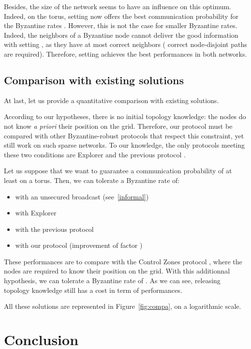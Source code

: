 \documentclass[a4paper,11pt]{article}
\begin{document}
Besides, the size of the network seems to have an influence on this optimum. Indeed, on the  torus, setting  now offers the best communication probability for the Byzantine rates .
However, this is not the case for smaller Byzantine rates. Indeed, the neighbors of a Byzantine node cannot deliver the good information with setting , as they have at most  correct neighbors ( correct node-disjoint paths are required). Therefore, setting  achieves the best performances in both networks.

\subsection{Comparison with existing solutions}

At last, let us provide a quantitative comparison with existing solutions. 

According to our hypotheses, there is no initial topology knowledge:
the nodes do not know \emph{a priori} their position on the grid. Therefore, our protocol must be compared with other Byzantine-robust protocols that respect this constraint, yet still work on such sparse networks.
To our knowledge, the only protocols meeting these two conditions
are Explorer \cite{NT09j} and the previous protocol \cite{Trig}.

Let us suppose that we want to guarantee a communication probability  of at least  on a  torus. Then, we can tolerate a Byzantine rate  of:
\begin{itemize}
\item  with an unsecured broadcast (see~\ref{informal})
\item  with Explorer \cite{NT09j}
\item  with the previous protocol \cite{Trig}
\item  with our protocol (improvement of factor )
\end{itemize}

These performances are to compare with the Control Zones protocol \cite{CtrZ}, where the nodes are required to know their position on the grid. With this additionnal hypothesis, we can tolerate a Byzantine rate of . As we can see, releasing topology knowledge still has a cost in term of performances.

All these solutions are represented in Figure~\ref{fig:compa}, on a logarithmic scale.

\section{Conclusion}
\end{document}
